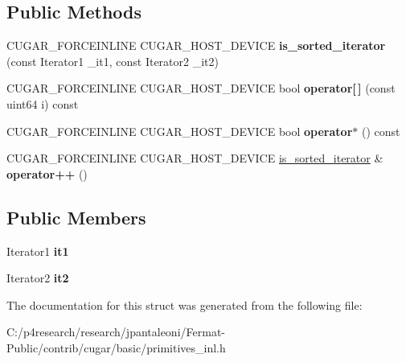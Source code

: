 \subsection*{Public Methods}
\begin{DoxyCompactItemize}
\item 
\mbox{\label{structcugar_1_1is__sorted__iterator_a7401a09c61834fef5a1da697da169a57}} 
C\+U\+G\+A\+R\+\_\+\+F\+O\+R\+C\+E\+I\+N\+L\+I\+NE C\+U\+G\+A\+R\+\_\+\+H\+O\+S\+T\+\_\+\+D\+E\+V\+I\+CE {\bfseries is\+\_\+sorted\+\_\+iterator} (const Iterator1 \+\_\+it1, const Iterator2 \+\_\+it2)
\item 
\mbox{\label{structcugar_1_1is__sorted__iterator_a326c321e3d6cc5aa672ab95dac1317bf}} 
C\+U\+G\+A\+R\+\_\+\+F\+O\+R\+C\+E\+I\+N\+L\+I\+NE C\+U\+G\+A\+R\+\_\+\+H\+O\+S\+T\+\_\+\+D\+E\+V\+I\+CE bool {\bfseries operator\mbox{[}$\,$\mbox{]}} (const uint64 i) const
\item 
\mbox{\label{structcugar_1_1is__sorted__iterator_a355a62fc5c0d076fc00a27f58e1b4238}} 
C\+U\+G\+A\+R\+\_\+\+F\+O\+R\+C\+E\+I\+N\+L\+I\+NE C\+U\+G\+A\+R\+\_\+\+H\+O\+S\+T\+\_\+\+D\+E\+V\+I\+CE bool {\bfseries operator$\ast$} () const
\item 
\mbox{\label{structcugar_1_1is__sorted__iterator_a8834b9927b8b1b35eab5bbc5fc59e444}} 
C\+U\+G\+A\+R\+\_\+\+F\+O\+R\+C\+E\+I\+N\+L\+I\+NE C\+U\+G\+A\+R\+\_\+\+H\+O\+S\+T\+\_\+\+D\+E\+V\+I\+CE \hyperlink{structcugar_1_1is__sorted__iterator}{is\+\_\+sorted\+\_\+iterator} \& {\bfseries operator++} ()
\end{DoxyCompactItemize}
\subsection*{Public Members}
\begin{DoxyCompactItemize}
\item 
\mbox{\label{structcugar_1_1is__sorted__iterator_a56f7b2a5b353df5b331b8d20dbaee4f7}} 
Iterator1 {\bfseries it1}
\item 
\mbox{\label{structcugar_1_1is__sorted__iterator_a0d7741722d95eea2b26852b4cc9e479a}} 
Iterator2 {\bfseries it2}
\end{DoxyCompactItemize}


The documentation for this struct was generated from the following file\+:\begin{DoxyCompactItemize}
\item 
C\+:/p4research/research/jpantaleoni/\+Fermat-\/\+Public/contrib/cugar/basic/primitives\+\_\+inl.\+h\end{DoxyCompactItemize}
